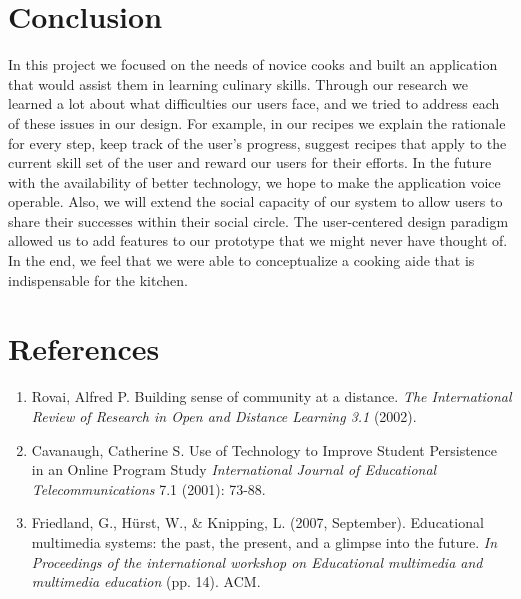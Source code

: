 \documentclass{sigchi}
\begin{document}
\section{Conclusion}
In this project we focused on the needs of novice cooks and built an application that would assist them in learning culinary skills. Through our research we learned a lot about what difficulties our users face, and we tried to address each of these issues in our design. For example, in our recipes we explain the rationale for every step, keep track of the user's progress, suggest recipes that apply to the current skill set of the user and reward our users for their efforts. In the future with the availability of better technology, we hope to make the application voice operable. Also, we will extend the social capacity of our system to allow users to share their successes within their social circle. The user-centered design paradigm allowed us to add features to our prototype that we might never have thought of. In the end, we feel that we were able to conceptualize a cooking aide that is indispensable for the kitchen.


%
%
%
%
%
\balance

%
%

\section{References}
\begin{enumerate}
\item Rovai, Alfred P. Building sense of community at a distance. \textit{The International Review of Research in Open and Distance Learning 3.1} (2002).
\item Cavanaugh, Catherine S. Use of Technology to Improve Student Persistence in an Online Program Study \textit{International Journal of Educational Telecommunications} 7.1 (2001): 73-88.
\item Friedland, G., Hürst, W., \& Knipping, L. (2007, September). Educational multimedia systems: the past, the present, and a glimpse into the future. \textit{In Proceedings of the international workshop on Educational multimedia and multimedia education} (pp. 1­4). ACM.
\end{enumerate}
\end{document}
